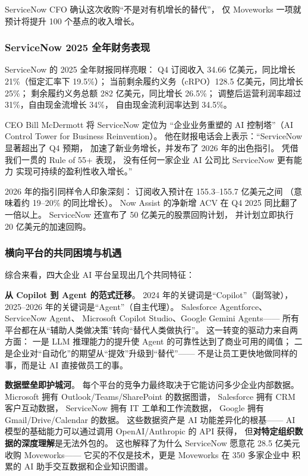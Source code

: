 ServiceNow CFO 确认这次收购``不是对有机增长的替代''，
仅 Moveworks 一项就预计将提升 100 个基点的收入增长。

\subsubsection{ServiceNow 2025 全年财务表现}
ServiceNow 的 2025 全年财报同样亮眼：
Q4 订阅收入 34.66 亿美元，同比增长 21\%（恒定汇率下 19.5\%）；
当前剩余履约义务（cRPO）128.5 亿美元，同比增长 25\%；
剩余履约义务总额 282 亿美元，同比增长 26.5\%；
调整后运营利润率超过 31\%，自由现金流增长 34\%，
自由现金流利润率达到 34.5\%。

CEO Bill McDermott 将 ServiceNow 定位为
``企业业务重塑的 AI 控制塔''（AI Control Tower for Business Reinvention）。
他在财报电话会上表示：``ServiceNow 显著超出了 Q4 预期，
加速了新业务增长，并发布了 2026 年的出色指引。
凭借我们一贯的 Rule of 55+ 表现，
没有任何一家企业 AI 公司比 ServiceNow 更有能力
实现可持续的盈利性收入增长。''

2026 年的指引同样令人印象深刻：
订阅收入预计在 155.3--155.7 亿美元之间
（意味着约 19--20\% 的同比增长）。
Now Assist 的净新增 ACV 在 Q4 2025 同比翻了一倍以上。
ServiceNow 还宣布了 50 亿美元的股票回购计划，
并计划立即执行 20 亿美元的加速回购。

\subsubsection{横向平台的共同困境与机遇}

综合来看，四大企业 AI 平台呈现出几个共同特征：

\textbf{从 Copilot 到 Agent 的范式迁移}。
2024 年的关键词是``Copilot''（副驾驶），
2025--2026 年的关键词是``Agent''（自主代理）。
Salesforce Agentforce、ServiceNow Agent、
Microsoft Copilot Studio、Google Gemini Agents——
所有平台都在从``辅助人类做决策''转向``替代人类做执行''。
这一转变的驱动力来自两方面：
一是 LLM 推理能力的提升使 Agent 的可靠性达到了商业可用的阈值；
二是企业对``自动化''的期望从``提效''升级到``替代''——
不是让员工更快地做同样的事，而是让 AI 直接做员工的事。

\textbf{数据壁垒即护城河}。
每个平台的竞争力最终取决于它能访问多少企业内部数据。
Microsoft 拥有 Outlook/Teams/SharePoint 的数据图谱，
Salesforce 拥有 CRM 客户互动数据，
ServiceNow 拥有 IT 工单和工作流数据，
Google 拥有 Gmail/Drive/Calendar 的数据。
这些数据资产是 AI 功能差异化的根基——
AI 模型的基础能力可以通过调用 OpenAI/Anthropic 的 API 获得，
但\textbf{对特定组织数据的深度理解}是无法外包的。
这也解释了为什么 ServiceNow 愿意花 28.5 亿美元收购 Moveworks——
它买的不仅是技术，更是 Moveworks 在 350 多家企业中
积累的 AI 助手交互数据和企业知识图谱。

